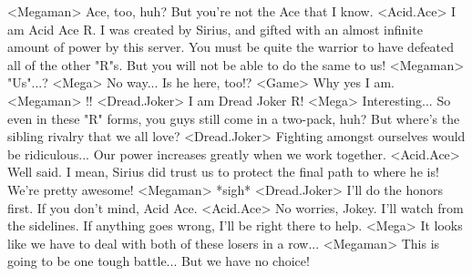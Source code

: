 <Megaman> Ace, too, huh? But you're not the Ace that I know. 
<Acid.Ace> I am Acid Ace R. 
I was created by Sirius, and gifted with an almost infinite 
amount of power by this server. 
You must be quite the warrior to have defeated all of the other "R"s. 
But you will not be able to do the same to us! 
<Megaman> "Us"...? 
<Mega> No way... Is he here, too!? 
<Game> Why yes I am. 
<Megaman> !! 
<Dread.Joker> I am Dread Joker R! 
<Mega> Interesting... 
So even in these "R" forms, you guys still come in a two-pack, huh? 
But where's the sibling rivalry that we all love? 
<Dread.Joker> Fighting amongst ourselves would be ridiculous... 
Our power increases greatly when we work together. 
<Acid.Ace> Well said. 
I mean, Sirius did trust us to protect the final path to where he is! 
We're pretty awesome! 
<Megaman> *sigh* 
<Dread.Joker> I'll do the honors first. If you don't mind, Acid Ace. 
<Acid.Ace> No worries, Jokey. I'll watch from the sidelines. 
If anything goes wrong, I'll be right there to help. 
<Mega> It looks like we have to deal with both of these losers in a row... 
<Megaman> This is going to be one tough battle... 
But we have no choice! 
